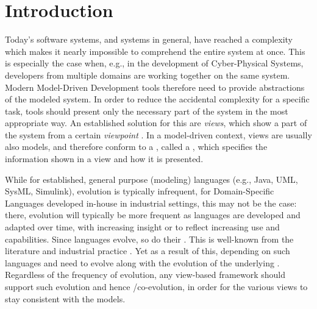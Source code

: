 \section{Introduction}
\label{sec:Introduction}

Today's software systems, and systems in general, have reached a complexity which
makes it nearly impossible to comprehend the entire system at once.
This is especially the case when, e.g., in the development of Cyber-Physical Systems,
developers from multiple domains are working together on the same system.
Modern Model-Driven Development tools therefore need to provide abstractions of the modeled system.
In order to reduce the accidental complexity for a specific task, tools should present only the necessary part of the system in the most appropriate way.
An established solution for this are \emph{views}, which show a part of the system from a certain \emph{viewpoint} \cite{atkinson_orthographic_2010}.
In a model-driven context, views are usually also models, and therefore conform to a \metamodel,
called a \emph{\viewtype} \cite{goldschmidt_towards_2012}, which specifies 
the information shown in a view and how it is presented.

While for established, general purpose (modeling) languages (e.g., Java, UML, SysML, Simulink), evolution is typically infrequent, for Domain-Specific Languages developed in-house in industrial settings, this may not be the case: there, evolution will typically be more frequent as languages are developed and adapted over time, with increasing insight or to reflect increasing use and capabilities.
Since languages evolve, so do their \metamodels. This is well-known from the literature and industrial practice \cite{durisic_evolution_2014}. Yet as a result of this, \viewtypes depending on such languages and \metamodels need to evolve along with the evolution of the underlying \metamodels. Regardless of the frequency of \metamodel evolution, any view-based framework should support such evolution and hence \metamodel/\viewtype co-evolution, in order for the various views to stay consistent with the models. 

